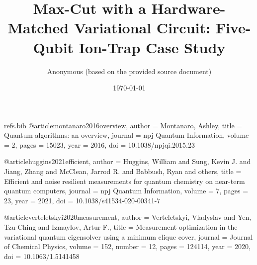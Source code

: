 \begin{filecontents*}{refs.bib}
@article{montanaro2016overview,
  author  = {Montanaro, Ashley},
  title   = {Quantum algorithms: an overview},
  journal = {npj Quantum Information},
  volume  = {2},
  pages   = {15023},
  year    = {2016},
  doi     = {10.1038/npjqi.2015.23}
}

@article{huggins2021efficient,
  author  = {Huggins, William and Sung, Kevin J. and Jiang, Zhang and McClean, Jarrod R. and Babbush, Ryan and others},
  title   = {Efficient and noise resilient measurements for quantum chemistry on near-term quantum computers},
  journal = {npj Quantum Information},
  volume  = {7},
  pages   = {23},
  year    = {2021},
  doi     = {10.1038/s41534-020-00341-7}
}

@article{verteletskyi2020measurement,
  author  = {Verteletskyi, Vladyslav and Yen, Tzu-Ching and Izmaylov, Artur F.},
  title   = {Measurement optimization in the variational quantum eigensolver using a minimum clique cover},
  journal = {Journal of Chemical Physics},
  volume  = {152},
  number  = {12},
  pages   = {124114},
  year    = {2020},
  doi     = {10.1063/1.5141458}
}
\end{filecontents*}

\documentclass[11pt]{article}
\usepackage[margin=1in]{geometry}
\usepackage[T1]{fontenc}
\usepackage[utf8]{inputenc}
\usepackage{microtype}
\usepackage{amsmath,amssymb,amsfonts}
\usepackage{booktabs}
\usepackage{hyperref}
\usepackage{graphicx}
\usepackage{caption}
\usepackage{subcaption}
\usepackage{algorithm}
\usepackage{algpseudocode}
\usepackage{siunitx}
\usepackage{tikz}
\usepackage{pgfplots}
\usepackage{longtable}
\pgfplotsset{compat=1.18}
\hypersetup{
    colorlinks=true,
    linkcolor=black,
    citecolor=blue!50!black,
    urlcolor=blue!50!black
}

\title{Max-Cut with a Hardware-Matched Variational Circuit: Five-Qubit Ion-Trap Case Study}
\author{Anonymous (based on the provided source document)}
\date{\today}


\maketitle

